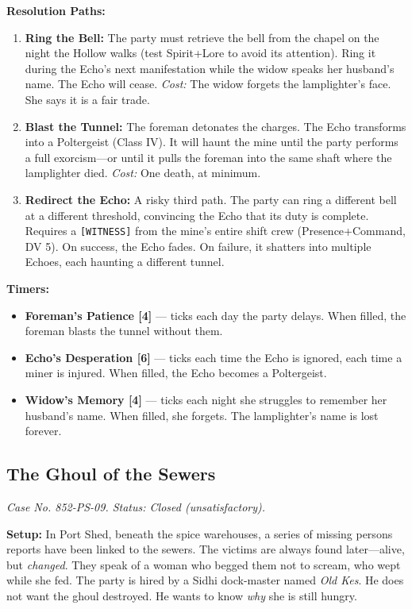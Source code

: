 \textbf{Resolution Paths:}
\begin{enumerate}
  \item \textbf{Ring the Bell:} The party must retrieve the bell from the chapel on the night the Hollow walks (test Spirit+Lore to avoid its attention). Ring it during the Echo's next manifestation while the widow speaks her husband's name. The Echo will cease. \textit{Cost:} The widow forgets the lamplighter's face. She says it is a fair trade.
  \item \textbf{Blast the Tunnel:} The foreman detonates the charges. The Echo transforms into a Poltergeist (Class IV). It will haunt the mine until the party performs a full exorcism---or until it pulls the foreman into the same shaft where the lamplighter died. \textit{Cost:} One death, at minimum.
  \item \textbf{Redirect the Echo:} A risky third path. The party can ring a different bell at a different threshold, convincing the Echo that its duty is complete. Requires a \texttt{[WITNESS]} from the mine's entire shift crew (Presence+Command, DV 5). On success, the Echo fades. On failure, it shatters into multiple Echoes, each haunting a different tunnel.
\end{enumerate}

\textbf{Timers:}
\begin{itemize}
  \item \textbf{Foreman's Patience [4]} --- ticks each day the party delays. When filled, the foreman blasts the tunnel without them.
  \item \textbf{Echo's Desperation [6]} --- ticks each time the Echo is ignored, each time a miner is injured. When filled, the Echo becomes a Poltergeist.
  \item \textbf{Widow's Memory [4]} --- ticks each night she struggles to remember her husband's name. When filled, she forgets. The lamplighter's name is lost forever.
\end{itemize}

\subsection{The Ghoul of the Sewers}

\emph{Case No. 852-PS-09. Status: Closed (unsatisfactory).}

\textbf{Setup:} In Port Shed, beneath the spice warehouses, a series of missing persons reports have been linked to the sewers. The victims are always found later---alive, but \emph{changed}. They speak of a woman who begged them not to scream, who wept while she fed. The party is hired by a Sidhi dock-master named \emph{Old Kes}. He does not want the ghoul destroyed. He wants to know \emph{why} she is still hungry.

